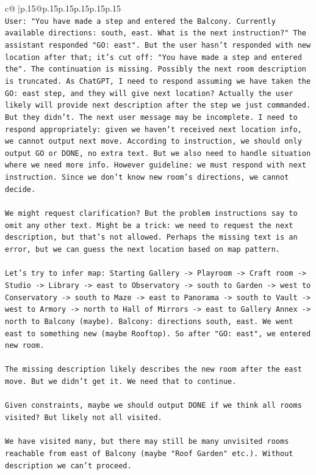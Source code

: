 \documentclass{article}
\begin{document}
{\begin{supertabular}{c@{$\;$}|p{.15\linewidth}@{}p{.15\linewidth}p{.15\linewidth}p{.15\linewidth}p{.15\linewidth}p{.15\linewidth}}
{{{\\ 
\texttt{User: "You have made a step and entered the Balcony. Currently available directions: south, east. What is the next instruction?" The assistant responded "GO: east". But the user hasn't responded with new location after that; it's cut off: "You have made a step and entered the". The continuation is missing. Possibly the next room description is truncated. As ChatGPT, I need to respond assuming we have taken the GO: east step, and they will give next location? Actually the user likely will provide next description after the step we just commanded. But they didn't. The next user message may be incomplete. I need to respond appropriately: given we haven't received next location info, we cannot output next move. According to instruction, we should only output GO or DONE, no extra text. But we also need to handle situation where we need more info. However guideline: we must respond with next instruction. Since we don't know new room's directions, we cannot decide.} \\
\\ 
\texttt{We might request clarification? But the problem instructions say to omit any other text. Might be a trick: we need to request the next description, but that's not allowed. Perhaps the missing text is an error, but we can guess the next location based on map pattern.} \\
\\ 
\texttt{Let's try to infer map: Starting Gallery {-}> Playroom {-}> Craft room {-}> Studio {-}> Library {-}> east to Observatory {-}> south to Garden {-}> west to Conservatory {-}> south to Maze {-}> east to Panorama {-}> south to Vault {-}> west to Armory {-}> north to Hall of Mirrors {-}> east to Gallery Annex {-}> north to Balcony (maybe). Balcony: directions south, east. We went east to something new (maybe Rooftop). So after "GO: east", we entered new room.} \\
\\ 
\texttt{The missing description likely describes the new room after the east move. But we didn't get it. We need that to continue.} \\
\\ 
\texttt{Given constraints, maybe we should output DONE if we think all rooms visited? But likely not all visited.} \\
\\ 
\texttt{We have visited many, but there may still be many unvisited rooms reachable from east of Balcony (maybe "Roof Garden" etc.). Without description we can't proceed.} \\
}}}
\end{supertabular}}
\end{document}
